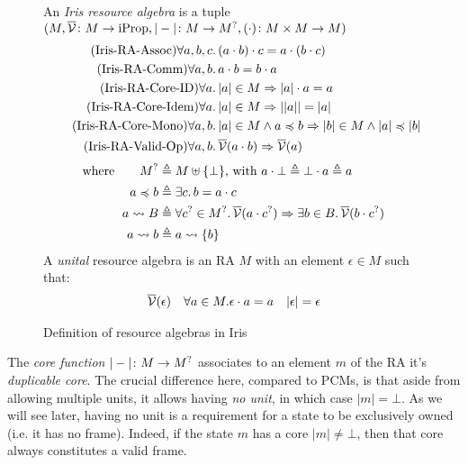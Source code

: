 \begin{figure}
An \emph{Iris resource algebra} is a tuple $(M, \overline{\cal V}\colon M\rightarrow \text{iProp}, |-|\colon M\rightarrow M^?, (\cdot)\colon M\times M\rightarrow M)$
\begin{align}
	\tag{Iris-RA-Assoc}
	\forall a,b,c&\ldotp (a\cdot b)\cdot c = a\cdot (b\cdot c)\\
	\tag{Iris-RA-Comm}
	\forall a,b&\ldotp a\cdot b = b\cdot a\\
	\tag{Iris-RA-Core-ID}
	\forall a&\ldotp |a| \in M \Rightarrow |a|\cdot a = a\\
	\tag{Iris-RA-Core-Idem}
	\forall a&\ldotp |a|\in M\Rightarrow ||a|| = |a|\\
	\tag{Iris-RA-Core-Mono}
	\forall a,b&\ldotp |a|\in M\land a\preccurlyeq b \Rightarrow |b| \in M \land |a| \preccurlyeq |b|\\
	\tag{Iris-RA-Valid-Op}\label{eq:iris-ra-valid-op}
	\forall a,b&\ldotp \overline{\cal V}(a\cdot b)\Rightarrow \overline{\cal V}(a)
\end{align}
\begin{align*}
	\text{where}\qquad
	M^? &\triangleq M \uplus \{\bot\}\text{, with }a\cdot \bot \triangleq \bot\cdot a\triangleq a\\
	a \preccurlyeq b &\triangleq \exists c\ldotp b = a\cdot c\\
	a \rightsquigarrow B &\triangleq \forall c^? \in M^?\ldotp \overline{\cal V}(a\cdot c^?) \Rightarrow \exists b\in B\ldotp \overline{\cal V}(b\cdot c^?)\\
	a \rightsquigarrow b &\triangleq a \rightsquigarrow \{b\}
\end{align*}
A \emph{unital} resource algebra is an RA $M$ with an element $\epsilon\in M$ such that:
\begin{align*}
	\overline{\cal V}(\epsilon) &&
	\forall a\in M. \epsilon\cdot a = a&&
	|\epsilon|=\epsilon
\end{align*}
\caption{Definition of resource algebras in Iris}
\label{fig:irisra-properties}
\end{figure}

The \emph{core function} $|-|\colon M\rightarrow M^?$ associates to an element $m$ of the RA it's \emph{duplicable core}. The crucial difference here, compared to PCMs, is that aside from allowing multiple units, it allows having \emph{no unit}, in which case $|m|=\bot$. As we will see later, having no unit is a requirement for a state to be exclusively owned (i.e. it has no frame). Indeed, if the state $m$ has a core $|m|\neq\bot$, then that core always constitutes a valid frame.

